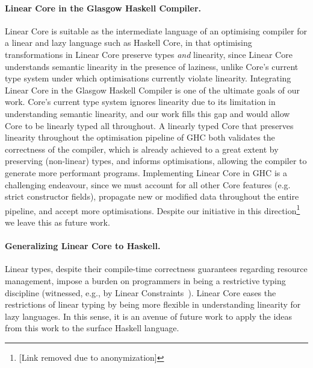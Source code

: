 \documentclass[acmsmall,review,screen]{acmart}
\begin{document}
\paragraph{Linear Core in the Glasgow Haskell Compiler.}
Linear Core is suitable as the intermediate language of an optimising compiler
for a linear and lazy language such as Haskell Core, in that optimising
transformations in Linear Core preserve types \emph{and} linearity, since Linear
Core understands semantic linearity in the presence of laziness, unlike
Core's current type system under which optimisations currently violate
linearity.
%
Integrating Linear Core in the Glasgow Haskell Compiler is one of the ultimate
goals of our work. Core's current type system ignores linearity due to
its limitation in understanding semantic linearity, and our work fills this gap
and would allow Core to be linearly typed all throughout.
%
A linearly typed Core that preserves linearity throughout the optimisation
pipeline of GHC both validates the correctness of the compiler, which is
already achieved to a great extent by preserving (non-linear) types, and
informs optimisations, allowing the compiler to generate more performant programs.
%
Implementing Linear Core in GHC is a challenging endeavour, since we must
account for all other Core features (e.g. strict constructor fields), propagate
new or modified data throughout the entire pipeline, and accept more
optimisations. Despite our initiative in this direction\footnote{[Link removed
due to
anonymization]} %
we leave this as future work.

\paragraph{Generalizing Linear Core to Haskell.}
Linear types, despite their compile-time correctness guarantees regarding
resource management, impose a burden on programmers in being a restrictive
typing discipline (witnessed, e.g., by Linear
Constraints~\cite{cite:linearconstraints}). Linear Core eases the restrictions
of linear typing by being more flexible in understanding linearity for lazy
languages. In this sense, it is an avenue of future
work to apply the ideas from this work to the surface Haskell language.

\end{document}
